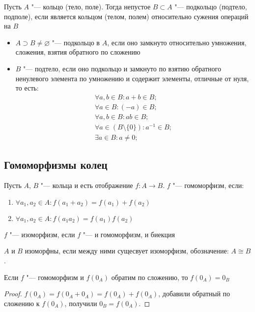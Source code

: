 \begin{Def}
Пусть $A$ "--- кольцо (тело, поле).
Тогда непустое $B \subset A$ "--- подкольцо (подтело, подполе), если является кольцом (телом, полем) относительно сужения операций на $B$
\end{Def}


\begin{Rem}
\begin{itemize}
	\item $A \supset B \neq \varnothing$ "--- подкольцо в $A$, если оно замкнуто относительно умножения, сложения, взятия обратного по сложению
	\item $B$ "--- подтело, если оно подкольцо и замкнуто по взятию обратного ненулевого элемента по умножению и содержит элементы, отличные от нуля, то есть:
	\begin{gather*}
	\forall a, b \in B \colon a + b \in B; \\
	\forall a \in B \colon (-a) \in B; \\
	\forall a, b \in B \colon ab \in B; \\
	\forall a \in (B \setminus \{0\}) \colon a^{-1} \in B; \\
	\exists a \in B \colon a \neq 0;
	\end{gather*}
\end{itemize}
\end{Rem}

\subsection{Гомоморфизмы колец}

\begin{Def}
	Пусть $A$, $B$ "--- кольца и есть отображение $f: A \to B$.
	$f$ "--- гомоморфизм, если:
	\begin{enumerate}	
	\item $\forall a_1, a_2 \in A \colon f(a_1 + a_2) = f(a_1) + f(a_2)$
	\item $\forall a_1, a_2 \in A \colon f(a_1a_2) = f(a_1)f(a_2)$
	\end{enumerate}
\end{Def}

\begin{Def}		
	$f$ "--- изоморфизм, если $f$ "--- и гомоморфизм, и биекция
\end{Def}

\begin{Def}		
	$A$ и $B$ изоморфны, если между ними сущесвует изоморфизм,
	обозначение: $A \cong B$.
\end{Def}
\begin{Rem}
	Если $f$ "--- гомоморфизм и $f(0_A)$ обратим по сложению, то $f(0_A) = 0_B$
\end{Rem}
\begin{proof}
	$f(0_A) = f(0_A + 0_A) = f(0_A) + f(0_A)$, добавили обратный по сложению к $f(0_A)$,
	получили $0_B = f(0_A)$.
\end{proof}

